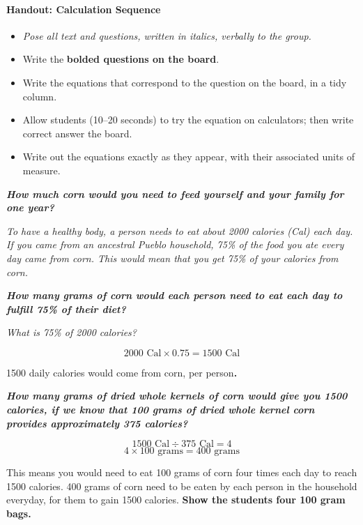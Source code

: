 \documentclass[12pt,]{article}
\providecommand{\tightlist}{%
  \setlength{\itemsep}{0pt}\setlength{\parskip}{0pt}}
\let\oldparagraph\paragraph
\renewcommand{\paragraph}[1]{\oldparagraph{#1}\mbox{}}
\begin{document}
\hypertarget{handout-calculation-sequence}{%
\paragraph{Handout: Calculation Sequence}\label{handout-calculation-sequence}}

\begin{itemize}
\tightlist
\item
  \emph{Pose all text and questions, written in italics, verbally to the group.}
\item
  Write the \textbf{bolded questions on the board}.
\item
  Write the equations that correspond to the question on the board, in a tidy column.
\item
  Allow students (10--20 seconds) to try the equation on calculators; then write correct answer the board.
\item
  Write out the equations exactly as they appear, with their associated units of measure.
\end{itemize}

\textbf{\emph{How much corn would you need to feed yourself and your family for one year? }}

\emph{To have a healthy body, a person needs to eat about 2000 calories (Cal) each day. If you came from an ancestral Pueblo household, 75\% of the food you ate every day came from corn. This would mean that you get 75\% of your calories from corn.}

\textbf{\emph{How many grams of corn would each person need to eat each day to fulfill 75\% of their diet?}}

\emph{What is 75\% of 2000 calories?}

\[2000 \text{ Cal} \times 0.75 = 1500 \text{ Cal}\]

1500 daily calories would come from corn, per person\textbf{.}

\textbf{\emph{How many grams of dried whole kernels of corn would give you 1500 calories, if we know that 100 grams of dried whole kernel corn provides approximately 375 calories?}}

\[1500 \text{ Cal} \div 375 \text{ Cal} = 4\]
\[4 \times 100 \text{ grams} = 400 \text{ grams}\]

This means you would need to eat 100 grams of corn four times each day to reach 1500 calories. 400 grams of corn need to be eaten by each person in the household everyday, for them to gain 1500 calories. \textbf{Show the students four 100 gram bags.}
\end{document}
